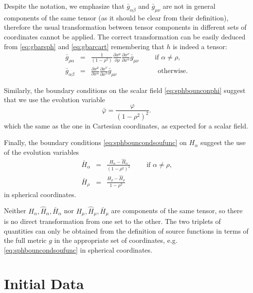 \documentclass[a4paper,11pt]{article}
\begin{document}
Despite the notation, we emphasize that $\bar{g}_{\alpha\beta}$ and $\bar{g}_{\mu\nu}$ are not in general components of the same tensor (as it should be clear from their definition), therefore the usual transformation between tensor components in different sets of coordinates cannot be applied. The correct transformation can be easily deduced from \eqref{eq:gbarsph} and \eqref{eq:gbarcart} remembering that $h$ is indeed a tensor: 
\begin{eqnarray}\label{eq:cartosph}
\bar{g}_{\rho\alpha}&=&\frac{1}{(1-\rho^2)}\frac{\partial x^\mu}{\partial \rho}\frac{\partial x^\nu}{\partial x^\alpha}\bar{g}_{\mu\nu}\qquad \textrm{ if $\alpha\neq\rho$}, \\ \nonumber
\bar{g}_{\alpha\beta}&=&\frac{\partial x^\mu}{\partial x^\alpha}\frac{\partial x^\nu}{\partial x^\beta}\bar{g}_{\mu\nu}\qquad\qquad \;\;\;\;\;\; \textrm{ otherwise}.
\end{eqnarray}

Similarly, the boundary conditions on the scalar field \eqref{eq:sphbounconphi} suggest that we use the evolution variable
\begin{equation}
\bar{\varphi}=\frac{\varphi }{(1-\rho^2)^2}.
\end{equation}
which the same as the one in Cartesian coordinates, as expected for a scalar field.

Finally, the boundary conditions \eqref{eq:sphbouncondsoufunc} on $H_\alpha$ suggest the use of the evolution variables
\begin{eqnarray}
 \bar{H}_\alpha&=&\frac{H_\alpha-\hat{H}_\alpha}{(1-\rho^2)^2 } \qquad \textrm{ if $\alpha\neq\rho$,} \\ \nonumber
  \bar{H}_\rho&=&\frac{H_\rho-\hat{H}_\rho}{1-\rho^2 }
 \end{eqnarray}
in spherical coordinates.

Neither $H_\alpha,\hat{H}_\alpha,\bar{H}_\alpha$ nor $H_\mu,\hat{H}_\mu,\bar{H}_\mu$ are components of the same tensor, so there is no direct transformation from one set to the other. The two triplets of quantities can only be obtained from the definition of source functions in terms of the full metric $g$ in the appropriate set of coordinates, e.g. \eqref{eq:sphbouncondsoufunc} in spherical coordinates.

\section{Initial Data}
\label{sec:initdata}
\end{document}
